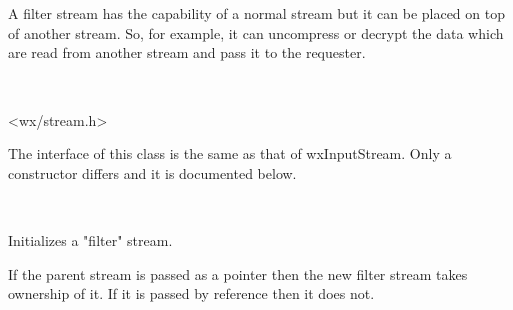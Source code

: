 \section{}\label{wxfilterinputstream}

A filter stream has the capability of a normal stream but it can be placed on top
of another stream. So, for example, it can uncompress or decrypt the data which are read
from another stream and pass it to the requester.


\\


<wx/stream.h>




The interface of this class is the same as that of wxInputStream. Only a constructor
differs and it is documented below.


\\


\label{wxfilterinputstreamctor}



Initializes a "filter" stream.

If the parent stream is passed as a pointer then the new filter stream
takes ownership of it. If it is passed by reference then it does not.

